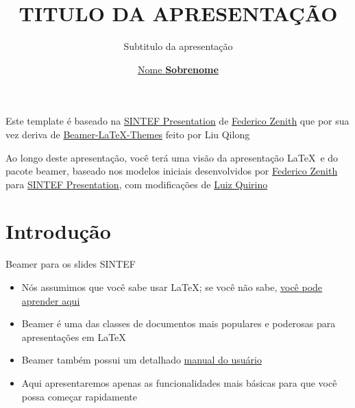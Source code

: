 \documentclass{beamer}
\title{TITULO DA APRESENTAÇÃO}
\subtitle{Subtitulo da apresentação}
\author{\href{mailto:<user-mail@ifsp.edu.br>}{Nome \textbf{Sobrenome}}}
\newcommand{\hrefcol}[2]{\textcolor{cyan}{\href{#1}{#2}}}
\begin{document}
\maketitle

\begin{frame}

      Este template é baseado na \hrefcol{https://www.overleaf.com/latex/templates/sintef-presentation/jhbhdffczpnx}{SINTEF Presentation} de \hrefcol{mailto:federico.zenith@sintef.no}{Federico Zenith} que por sua vez deriva de \hrefcol{https://github.com/TOB-KNPOB/Beamer-LaTeX-Themes}{Beamer-LaTeX-Themes} feito por Liu Qilong

      \vspace{\baselineskip}

      Ao longo deste apresentação, você terá uma visão da apresentação \LaTeX\ e do pacote beamer, 
      baseado nos modelos iniciais desenvolvidos por \hrefcol{mailto:federico.zenith@sintef.no}{Federico Zenith} 
      para \hrefcol{https://www.overleaf.com/latex/templates/sintef-presentation/jhbhdffczpnx}{SINTEF Presentation}, 
      com modificações de \hrefcol{mailto:luiz.quirino@ifsp.edu.br}{Luiz Quirino}


\end{frame}

\section{Introdução}

\begin{frame}{Beamer para os slides SINTEF}
      \begin{itemize}
            \item Nós assumimos que você sabe usar \LaTeX; se você não sabe,
                  \hrefcol{http://en.wikibooks.org/wiki/LaTeX/}{você pode aprender aqui}
            \item Beamer é uma das classes de documentos mais populares e poderosas para apresentações em \LaTeX
            \item Beamer também possui um detalhado
                  \hrefcol{http://www.ctan.org/tex-archive/macros/latex/contrib/beamer/doc/beameruserguide.pdf}{manual do usuário}
            \item Aqui apresentaremos apenas as funcionalidades mais básicas para que você possa começar rapidamente
      \end{itemize}
\end{frame}
\end{document}
